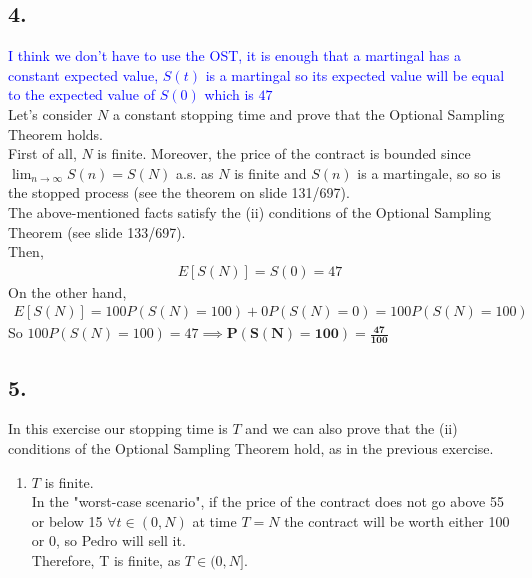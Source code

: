 \subsection*{4.}

\textcolor{blue}{I think we don't have to use the OST, it is enough that a martingal has a constant expected value, $S(t)$ is a martingal so its expected value will be equal to the expected value of $S(0)$ which is $47$} \\
Let's consider $N$ a constant stopping time and prove that the Optional Sampling Theorem holds.\\
First of all, $N$ is finite. Moreover, the price of the contract is bounded since $\lim_{n \to \infty} S(n) = S(N)$ a.s. as $N$ is finite and $S(n)$ is a martingale, so so is the stopped process (see the theorem on slide 131/697).\\
The above-mentioned facts satisfy the (ii) conditions of the Optional Sampling Theorem (see slide 133/697).\\
Then,
\begin{gather*}
    E[S(N)] = S(0) = 47
\end{gather*}
On the other hand,
\begin{gather*}
    E[S(N)] = 100P(S(N)=100)+0P(S(N)=0) = 100P(S(N)=100)
\end{gather*}
So $100P(S(N)=100)=47 \implies \mathbf{P(S(N)=100) = \frac{47}{100}}$

\subsection*{5.}
In this exercise our stopping time is $T$ and we can also prove that the (ii) conditions of the Optional Sampling Theorem hold, as in the previous exercise.\\
\begin{enumerate}
    \item $T$ is finite.\\
    In the "worst-case scenario", if the price of the contract does not go above 55 or below 15 $\forall t \in (0,N)$ at time $T=N$ the contract will be worth either 100 or 0, so Pedro will sell it.\\
    Therefore, T is finite, as $T \in (0,N]$.
\end{enumerate}